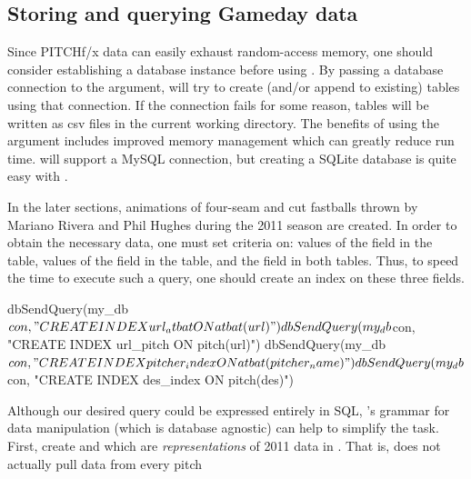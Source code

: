 \begin{article}
\section{Storing and querying Gameday data}

Since PITCHf/x data can easily exhaust random-access memory, one should
consider establishing a database instance before using .
By passing a database connection to the  argument,
 will try to create (and/or append to existing) tables
using that connection. If the connection fails for some reason, tables
will be written as csv files in the current working directory. The
benefits of using the  argument includes improved memory
management which can greatly reduce run time.  will
support a MySQL connection, but creating a SQLite database is quite
easy with  \citep{dplyr}. 
%
\begin{Schunk}
\end{Schunk}
%
In the later sections, animations of four-seam and cut fastballs thrown
by Mariano Rivera and Phil Hughes during the 2011 season are created.
In order to obtain the necessary data, one must set criteria on: values
of the  field in the  table, values
of the  field in the  table, and the 
field in both tables. Thus, to speed the time to execute such a query,
one should create an index on these three fields.
%
\begin{Schunk}
\begin{Sinput}
dbSendQuery(my_db$con, "CREATE INDEX url_atbat ON atbat(url)") 
dbSendQuery(my_db$con, "CREATE INDEX url_pitch ON pitch(url)") 
dbSendQuery(my_db$con, "CREATE INDEX pitcher_index ON atbat(pitcher_name)") 
dbSendQuery(my_db$con, "CREATE INDEX des_index ON pitch(des)")
\end{Sinput}
\end{Schunk}
%
Although our desired query could be expressed entirely in SQL, 's
grammar for data manipulation (which is database agnostic) can help
to simplify the task. First, create  and 
which are \emph{representations} of 2011 data in .
That is,  does not actually pull data from every pitch

\end{article}
